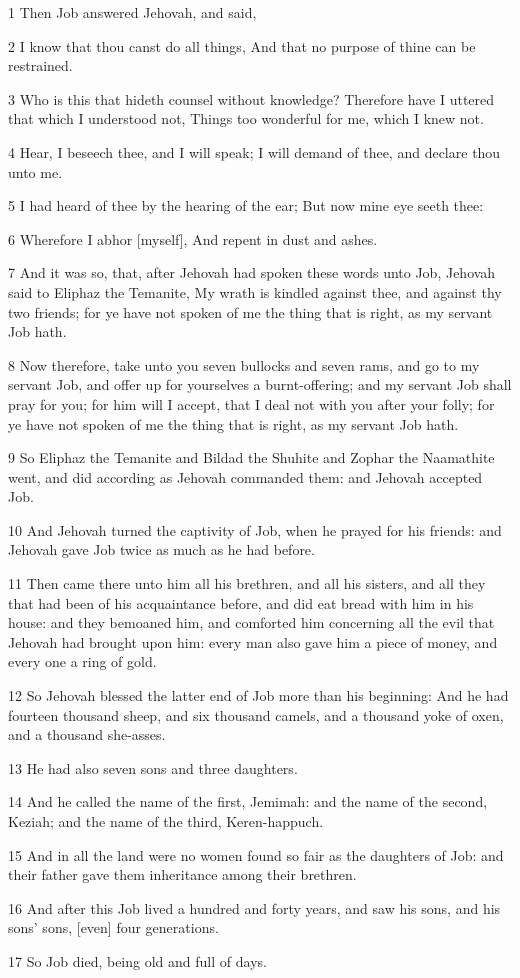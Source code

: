 \par 1 Then Job answered Jehovah, and said,
\par 2 I know that thou canst do all things, And that no purpose of thine can be restrained.
\par 3 Who is this that hideth counsel without knowledge? Therefore have I uttered that which I understood not, Things too wonderful for me, which I knew not.
\par 4 Hear, I beseech thee, and I will speak; I will demand of thee, and declare thou unto me.
\par 5 I had heard of thee by the hearing of the ear; But now mine eye seeth thee:
\par 6 Wherefore I abhor [myself], And repent in dust and ashes.
\par 7 And it was so, that, after Jehovah had spoken these words unto Job, Jehovah said to Eliphaz the Temanite, My wrath is kindled against thee, and against thy two friends; for ye have not spoken of me the thing that is right, as my servant Job hath.
\par 8 Now therefore, take unto you seven bullocks and seven rams, and go to my servant Job, and offer up for yourselves a burnt-offering; and my servant Job shall pray for you; for him will I accept, that I deal not with you after your folly; for ye have not spoken of me the thing that is right, as my servant Job hath.
\par 9 So Eliphaz the Temanite and Bildad the Shuhite and Zophar the Naamathite went, and did according as Jehovah commanded them: and Jehovah accepted Job.
\par 10 And Jehovah turned the captivity of Job, when he prayed for his friends: and Jehovah gave Job twice as much as he had before.
\par 11 Then came there unto him all his brethren, and all his sisters, and all they that had been of his acquaintance before, and did eat bread with him in his house: and they bemoaned him, and comforted him concerning all the evil that Jehovah had brought upon him: every man also gave him a piece of money, and every one a ring of gold.
\par 12 So Jehovah blessed the latter end of Job more than his beginning: And he had fourteen thousand sheep, and six thousand camels, and a thousand yoke of oxen, and a thousand she-asses.
\par 13 He had also seven sons and three daughters.
\par 14 And he called the name of the first, Jemimah: and the name of the second, Keziah; and the name of the third, Keren-happuch.
\par 15 And in all the land were no women found so fair as the daughters of Job: and their father gave them inheritance among their brethren.
\par 16 And after this Job lived a hundred and forty years, and saw his sons, and his sons' sons, [even] four generations.
\par 17 So Job died, being old and full of days.

